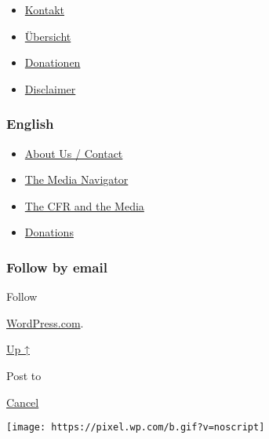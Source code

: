 \begin{itemize}
\tightlist
\item
  \href{https://swprs.org/kontakt/}{Kontakt}
\item
  \href{https://swprs.org/uebersicht/}{Übersicht}
\item
  \href{https://swprs.org/donationen/}{Donationen}
\item
  \href{https://swprs.org/disclaimer/}{Disclaimer}
\end{itemize}

\hypertarget{english}{%
\subsubsection{English}\label{english}}

\begin{itemize}
\tightlist
\item
  \href{https://swprs.org/contact/}{About Us / Contact}
\item
  \href{https://swprs.org/media-navigator/}{The Media Navigator}
\item
  \href{https://swprs.org/the-american-empire-and-its-media/}{The CFR
  and the Media}
\item
  \href{https://swprs.org/donations/}{Donations}
\end{itemize}

\hypertarget{follow-by-email}{%
\subsubsection{Follow by email}\label{follow-by-email}}

Follow

\href{https://wordpress.com/?ref=footer_custom_com}{WordPress.com}.

\protect\hyperlink{}{Up ↑}

Post to

\protect\hyperlink{}{Cancel}

\texttt{[image: https://pixel.wp.com/b.gif?v=noscript]}
